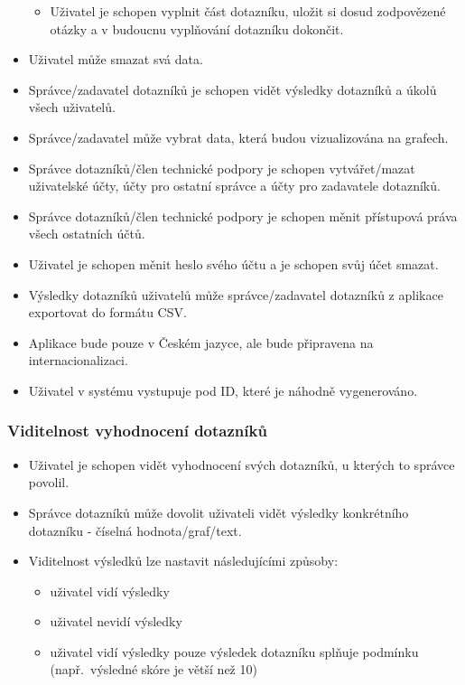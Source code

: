 \begin{itemize}
  \begin{itemize}
  \item
    Uživatel je schopen vyplnit část dotazníku, uložit si dosud zodpovězené otázky a v budoucnu vyplňování dotazníku dokončit.
  \end{itemize}
\item
  Uživatel může smazat svá data.
\item
  Správce/zadavatel dotazníků je schopen vidět výsledky dotazníků a úkolů všech uživatelů.
\item
  Správce/zadavatel může vybrat data, která budou vizualizována na grafech.
\item
  Správce dotazníků/člen technické podpory je schopen vytvářet/mazat uživatelské účty, účty pro ostatní správce a účty pro zadavatele dotazníků.
\item
  Správce dotazníků/člen technické podpory je schopen měnit přístupová práva všech ostatních účtů.
\item
  Uživatel je schopen měnit heslo svého účtu a je schopen svůj účet smazat.
\item
  Výsledky dotazníků uživatelů může správce/zadavatel dotazníků z aplikace exportovat do formátu CSV\@.
\item
  Aplikace bude pouze v Českém jazyce, ale bude připravena na internacionalizaci.
\item
  Uživatel v systému vystupuje pod ID, které je náhodně vygenerováno.
\end{itemize}


\subsubsection{Viditelnost vyhodnocení dotazníků}

\begin{itemize}
\item
Uživatel je schopen vidět vyhodnocení svých dotazníků, u kterých to správce povolil.
\item
Správce dotazníků může dovolit uživateli vidět výsledky konkrétního dotazníku - číselná hodnota/graf/text.
\item
  Viditelnost výsledků lze nastavit následujícími způsoby:

  \begin{itemize}
  \item
    uživatel vidí výsledky
  \item
    uživatel nevidí výsledky
  \item
    uživatel vidí výsledky pouze výsledek dotazníku splňuje podmínku (např.\ výsledné skóre je větší než 10)
  \end{itemize}
\end{itemize}


